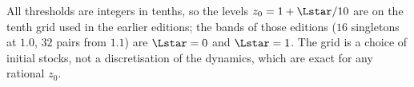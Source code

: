 \begin{remark}
All thresholds are integers in tenths, so the levels $z_0=1+\Lstar/10$ are on the tenth grid used in the earlier editions; the bands of those editions ($16$ singletons at $1.0$, $32$ pairs from $1.1$) are $\Lstar=0$ and $\Lstar=1$. The grid is a choice of initial stocks, not a discretisation of the dynamics, which are exact for any rational $z_0$.
\end{remark}
